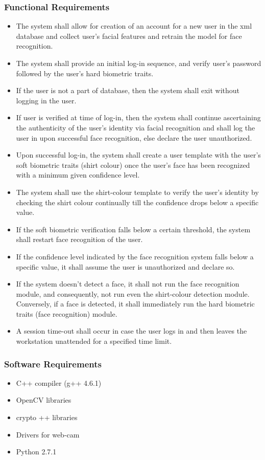 \documentclass[12pt]{article}			%
\begin{document}
\subsubsection{ Functional Requirements }
\begin{itemize}
	\item The system shall allow for creation of an account for a new user in the xml database and collect user's facial features and retrain the model for face recognition.
	\item The system shall provide an initial log-in sequence, and verify user's password followed by the user's hard biometric traits.
	\item If the user is not a part of database, then the system shall exit without logging in the user.
	\item If user is verified at time of log-in, then the system shall continue ascertaining the authenticity of the user's identity via facial recognition and shall log the user in upon successful face recognition, else declare the user unauthorized.
	\item Upon successful log-in, the system shall create a user template with the user's soft biometric traits (shirt colour) once the user's face has been recognized with a minimum given confidence level.
	\item The system shall use the shirt-colour template to verify the user's identity by checking the shirt colour continually till the confidence drops below a specific value.
	\item If the soft biometric verification falls below a certain threshold, the system shall restart face recognition of the user.
	\item If the confidence level indicated by the face recognition system falls below a specific value, it shall assume the user is unauthorized and declare so. %
	\item If the system doesn't detect a face, it shall not run the face recognition module, and consequently, not run even the shirt-colour detection module. Conversely, if a face is detected, it shall immediately run the hard biometric traits (face recognition) module.
	\item A session time-out shall occur in case the user logs in and then leaves the workstation unattended for a specified time limit.
\end{itemize}

\subsubsection{ Software Requirements }
\begin{itemize}
\item C++ compiler (g++ 4.6.1)
\item OpenCV libraries
\item crypto ++ libraries
\item Drivers for web-cam
\item Python 2.7.1
\end{itemize}
\end{document}
